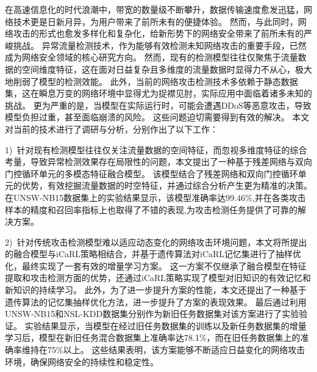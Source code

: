 \begin{cabstract}
在高速信息化的时代浪潮中，带宽的数量级不断攀升，数据传输速度愈发迅猛，网络技术更是日新月异，为用户带来了前所未有的便捷体验。
然而，与此同时，网络攻击的形式也愈发多样化和复杂化，给新形势下的网络安全带来了前所未有的严峻挑战。
异常流量检测技术，作为能够有效检测未知网络攻击的重要手段，已然成为网络安全领域的核心研究方向。
然而，现有的检测模型往往仅聚焦于流量数据的空间维度特征，这在面对日益复杂且多维度的流量数据时显得力不从心，极大地削弱了模型的检测效能。
此外，当前的网络攻击检测技术多依赖于静态数据集，这在瞬息万变的网络环境中显得尤为捉襟见肘，实际应用中面临着诸多未知的挑战。
更为严重的是，当模型在实际运行时，可能会遭遇DDoS等恶意攻击，导致模型负担过重，甚至面临崩溃的风险。
这些问题迫切需要得到有效的解决。
本文对当前的技术进行了调研与分析，分别作出了以下工作：\par

1)~针对现有检测模型往往仅关注流量数据的空间特征，而忽视多维度特征的综合考量，导致异常检测效果存在局限性的问题，本文提出了一种基于残差网络与双向门控循环单元的多模态特征融合模型。
该模型结合了残差网络和双向门控循环单元的优势，有效挖掘流量数据的时空特征，并通过综合分析产生更为精准的决策。
在UNSW-NB15数据集上的实验结果显示，该模型准确率达99.46\%,并在各类攻击样本的精度和召回率指标上也取得了不错的表现,为攻击检测任务提供了可靠的解决方案。\par

2)~针对传统攻击检测模型难以适应动态变化的网络攻击环境问题，本文将所提出的融合模型与iCaRL策略相结合，并基于遗传算法对iCaRL记忆集进行了抽样优化，最终实现了一套有效的增量学习方案。
这一方案不仅继承了融合模型在特征提取和攻击检测方面的优势，还通过iCaRL策略实现了模型对旧知识的有效记忆和新知识的持续学习。
此外，为了进一步提升方案的性能，本文还提出了一种基于遗传算法的记忆集抽样优化方法，进一步提升了方案的表现效果。
最后通过利用UNSW-NB15和NSL-KDD数据集分别作为新旧任务数据集对该方案进行了实验验证。
实验结果显示，当模型在经过旧任务数据集的训练以及新任务数据集的增量学习后，模型在新旧任务混合数据集上准确率达78.1\%，而在旧任务数据集上的准确率维持在75\%以上。
这些结果表明，该方案能够不断适应日益变化的网络攻击环境，确保网络安全的持续性和稳定性。\par


\end{cabstract}
